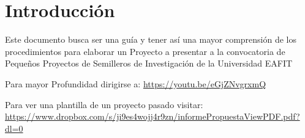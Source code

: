 \section{Introducción}

Este documento busca ser una guía y tener así una mayor comprensión de los procedimientos para elaborar un Proyecto a presentar a la convocatoria de Pequeños Proyectos de Semilleros de Investigación de la Universidad EAFIT

Para mayor Profundidad dirigirse a: \url{https://youtu.be/eGjZNvgrxmQ}

Para ver una plantilla de un proyecto pasado visitar: \url{https://www.dropbox.com/s/ji9es4wojj4r9zn/informePropuestaViewPDF.pdf?dl=0}
 